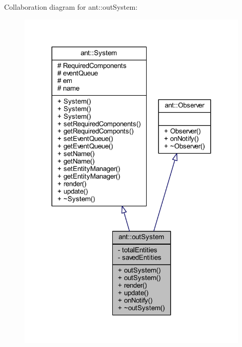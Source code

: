 Collaboration diagram for ant\+:\+:out\+System\+:
\nopagebreak
\begin{figure}[H]
\begin{center}
\leavevmode
\includegraphics[width=312pt]{db/d27/classant_1_1out_system__coll__graph}
\end{center}
\end{figure}
